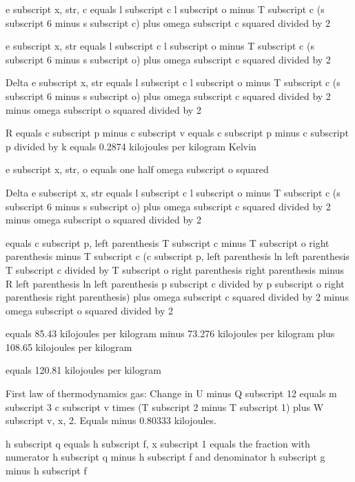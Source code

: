 e subscript x, str, c equals l subscript c l subscript o minus T subscript c (s subscript 6 minus s subscript c) plus omega subscript c squared divided by 2

e subscript x, str equals l subscript c l subscript o minus T subscript c (s subscript 6 minus s subscript o) plus omega subscript c squared divided by 2

Delta e subscript x, str equals l subscript c l subscript o minus T subscript c (s subscript 6 minus s subscript o) plus omega subscript c squared divided by 2 minus omega subscript o squared divided by 2

R equals c subscript p minus c subscript v
equals c subscript p minus c subscript p divided by k equals 0.2874 kilojoules per kilogram Kelvin

e subscript x, str, o equals one half omega subscript o squared

Delta e subscript x, str equals l subscript c l subscript o minus T subscript c (s subscript 6 minus s subscript o) plus omega subscript c squared divided by 2 minus omega subscript o squared divided by 2

equals c subscript p, left parenthesis T subscript c minus T subscript o right parenthesis minus T subscript c (c subscript p, left parenthesis ln left parenthesis T subscript c divided by T subscript o right parenthesis right parenthesis minus R left parenthesis ln left parenthesis p subscript c divided by p subscript o right parenthesis right parenthesis) plus omega subscript c squared divided by 2 minus omega subscript o squared divided by 2

equals 85.43 kilojoules per kilogram minus 73.276 kilojoules per kilogram plus 108.65 kilojoules per kilogram

equals 120.81 kilojoules per kilogram

First law of thermodynamics gas:
Change in U minus Q subscript 12 equals m subscript 3 c subscript v times (T subscript 2 minus T subscript 1) plus W subscript v, x, 2.
Equals minus 0.80333 kilojoules.

h subscript q equals h subscript f, x subscript 1 equals the fraction with numerator h subscript q minus h subscript f and denominator h subscript g minus h subscript f